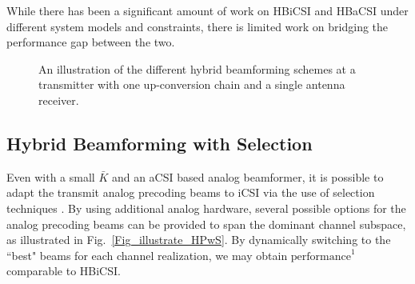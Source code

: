 \documentclass[journal,comsoc]{IEEEtran}
\begin{document}
%
While there has been a significant amount of work on HBiCSI and HBaCSI under different system models and constraints, there is limited work on bridging the performance gap between the two. 
%
%
\begin{figure}[!h]
\centering
{} \hspace{5mm}
 \hspace{5mm}
\caption{An illustration of the different hybrid beamforming schemes at a transmitter with one up-conversion chain and a single antenna receiver.}
\label{fig_illustrate_HPschemes}
\end{figure}
%
\subsection{Hybrid Beamforming with Selection} \label{subsec_HBwS_intro}
Even with a small $\bar{K}$ and an aCSI based analog beamformer, it is possible to adapt the transmit analog precoding beams to iCSI via the use of selection techniques \cite{Sudarshan}. 
By using additional analog hardware, several possible options for the analog precoding beams can be provided to span the dominant channel subspace, as illustrated in Fig.~\ref{Fig_illustrate_HPwS}. By dynamically switching to the ``best" beams for each channel realization, we may obtain $\text{performance}^{1}$ comparable to HBiCSI. 
\end{document}
